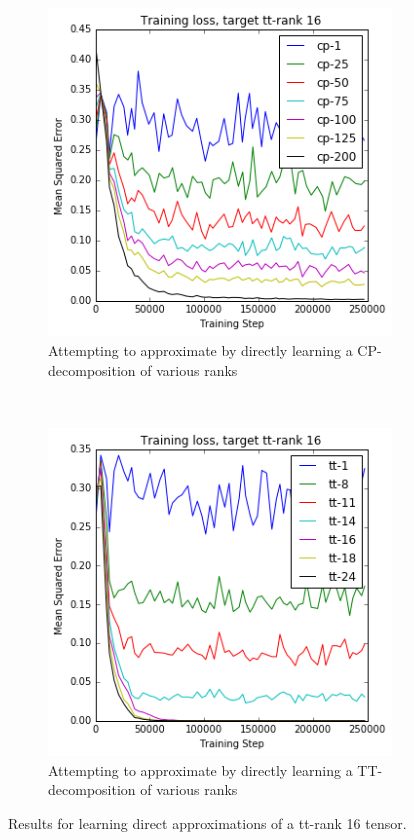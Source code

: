 {\begin{figure}
\centering
\begin{subfigure}[t]{0.45\textwidth}
	\includegraphics[width=\textwidth]{tensors/tt16cpapprox}
	\caption{Attempting to approximate by directly learning a 
		CP-decomposition of various ranks}
	\label{fig:ttcpapprox}
\end{subfigure}
~
\begin{subfigure}[t]{0.45\textwidth}
	\includegraphics[width=\textwidth]{tensors/tt16ttapprox}
	\caption{Attempting to approximate by directly learning a TT-decomposition of various ranks}
	\label{fig:ttttapprox}
\end{subfigure}
\caption{Results for learning direct approximations of a tt-rank 16 tensor.}
\label{fig:ttapprox}
\end{figure}

}
